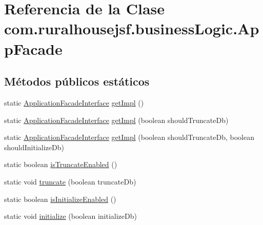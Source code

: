 \hypertarget{classcom_1_1ruralhousejsf_1_1business_logic_1_1_app_facade}{}\section{Referencia de la Clase com.\+ruralhousejsf.\+business\+Logic.\+App\+Facade}
\label{classcom_1_1ruralhousejsf_1_1business_logic_1_1_app_facade}
\subsection*{Métodos públicos estáticos}
\begin{DoxyCompactItemize}
\item 
static \mbox{\hyperlink{interfacecom_1_1ruralhousejsf_1_1business_logic_1_1_application_facade_interface}{Application\+Facade\+Interface}} \mbox{\hyperlink{classcom_1_1ruralhousejsf_1_1business_logic_1_1_app_facade_a029bcceee98b9070b9f80abc54db45d6}{get\+Impl}} ()
\item 
static \mbox{\hyperlink{interfacecom_1_1ruralhousejsf_1_1business_logic_1_1_application_facade_interface}{Application\+Facade\+Interface}} \mbox{\hyperlink{classcom_1_1ruralhousejsf_1_1business_logic_1_1_app_facade_aa4bf7166aae19a2d640fd6ab8a0fff96}{get\+Impl}} (boolean should\+Truncate\+Db)
\item 
static \mbox{\hyperlink{interfacecom_1_1ruralhousejsf_1_1business_logic_1_1_application_facade_interface}{Application\+Facade\+Interface}} \mbox{\hyperlink{classcom_1_1ruralhousejsf_1_1business_logic_1_1_app_facade_aab339d9b44293704c9214aef70c7c704}{get\+Impl}} (boolean should\+Truncate\+Db, boolean should\+Initialize\+Db)
\item 
static boolean \mbox{\hyperlink{classcom_1_1ruralhousejsf_1_1business_logic_1_1_app_facade_a3638d881ea2d917df632a313d9ed9b20}{is\+Truncate\+Enabled}} ()
\item 
static void \mbox{\hyperlink{classcom_1_1ruralhousejsf_1_1business_logic_1_1_app_facade_a98aed1ed8a03c6a92e15121fed4eb452}{truncate}} (boolean truncate\+Db)
\item 
static boolean \mbox{\hyperlink{classcom_1_1ruralhousejsf_1_1business_logic_1_1_app_facade_a0486115e3ba238d025e23ec62548b3bc}{is\+Initialize\+Enabled}} ()
\item 
static void \mbox{\hyperlink{classcom_1_1ruralhousejsf_1_1business_logic_1_1_app_facade_a48252ec119a6bb16f5353df6ec6eff54}{initialize}} (boolean initialize\+Db)
\end{DoxyCompactItemize}
